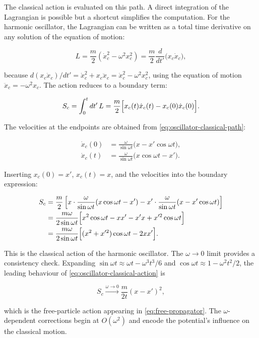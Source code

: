 The classical action is evaluated on this path. A direct integration of the Lagrangian is possible but a shortcut simplifies the computation. For the harmonic oscillator, the Lagrangian can be written as a total time derivative on any solution of the equation of motion:
\begin{linenomath}
\begin{equation}
L = \frac{m}{2}(\dot{x}_c^2 - \omega^2 x_c^2)
= \frac{m}{2}\frac{d}{dt'}\bigl(x_c \dot{x}_c\bigr),
\end{equation}
\end{linenomath}
because $d(x_c\dot{x}_c)/dt' = \dot{x}_c^2 + x_c\ddot{x}_c = \dot{x}_c^2 - \omega^2 x_c^2$, using the equation of motion $\ddot{x}_c = -\omega^2 x_c$. The action reduces to a boundary term:
\begin{linenomath}
\begin{equation}
S_c = \int_0^t dt'\,L = \frac{m}{2}\Bigl[x_c(t)\dot{x}_c(t) - x_c(0)\dot{x}_c(0)\Bigr].
\end{equation}
\end{linenomath}
The velocities at the endpoints are obtained from \eqref{eq:oscillator-classical-path}:
\begin{linenomath}
\begin{align}
\dot{x}_c(0) &= \frac{\omega}{\sin\omega t}\bigl(x - x'\cos\omega t\bigr), \\
\dot{x}_c(t) &= \frac{\omega}{\sin\omega t}\bigl(x\cos\omega t - x'\bigr).
\end{align}
\end{linenomath}
Inserting $x_c(0) = x'$, $x_c(t) = x$, and the velocities into the boundary expression:
\begin{linenomath}
\begin{align}
S_c &= \frac{m}{2}\left[x\cdot\frac{\omega}{\sin\omega t}(x\cos\omega t - x') - x'\cdot\frac{\omega}{\sin\omega t}(x - x'\cos\omega t)\right] \notag\\
&= \frac{m\omega}{2\sin\omega t}\Bigl[x^2\cos\omega t - xx' - x'x + x'^2\cos\omega t\Bigr] \notag\\
&= \frac{m\omega}{2\sin\omega t}\Bigl[(x^2 + x'^2)\cos\omega t - 2xx'\Bigr].
\label{eq:oscillator-classical-action}
\end{align}
\end{linenomath}
This is the classical action of the harmonic oscillator. The $\omega \to 0$ limit provides a consistency check. Expanding $\sin\omega t \approx \omega t - \omega^3 t^3/6$ and $\cos\omega t \approx 1 - \omega^2 t^2/2$, the leading behaviour of \eqref{eq:oscillator-classical-action} is
\begin{linenomath}
\begin{equation}
S_c \xrightarrow{\omega\to 0} \frac{m}{2t}(x-x')^2,
\end{equation}
\end{linenomath}
which is the free-particle action appearing in \eqref{eq:free-propagator}. The $\omega$-dependent corrections begin at $O(\omega^2)$ and encode the potential's influence on the classical motion.

